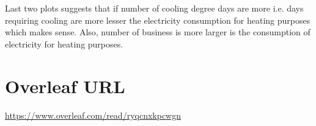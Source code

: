 \documentclass[letterpaper,12pt]{article}
\begin{document}
Last two plots suggests that if number of cooling degree days are more i.e. days requiring cooling are more lesser the electricity consumption for heating purposes which makes sense. Also, number of business is more larger is the consumption of electricity for heating purposes.
\section{Overleaf URL}

\url{https://www.overleaf.com/read/ryqcnxkpcwgn}

% 
\end{document}
